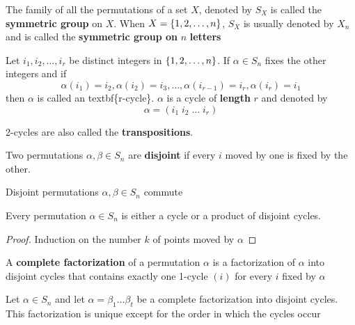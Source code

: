 \documentclass[11pt]{article}
\begin{document}
\begin{definition}[]
The family of all the permutations of a set \(X\), denoted by \(S_X\) is called
the \textbf{symmetric group} on \(X\). When \(X=\left\{ 1,2,\dots,n\right\}\), \(S_X\) is
usually denoted by \(X_n\) and is called the \textbf{symmetric group on } \(n\)
\textbf{letters} 
\end{definition}

\begin{definition}[]
Let \(i_1,i_2,\dots,i_r\) be distinct integers in \(\left\{ 1,2,\dots,n\right\}\). If
\(\alpha\in S_n\) fixes the other integers and if
\begin{equation*}
\alpha(i_1)=i_2,\alpha(i_2)=i_3,\dots,\alpha(i_{r-1})=i_r,\alpha(i_r)=i_1
\end{equation*}
then \(\alpha\) is called an textbf\{r-cycle\}. \(\alpha\) is a cycle of
\textbf{length} \(r\) and denoted by
\begin{equation*}
\alpha=(i_1\; i_2\;\dots\; i_r)
\end{equation*}
\end{definition}

2-cycles are also called the \textbf{transpositions}.

\begin{definition}[]
Two permutations \(\alpha,\beta\in S_n\) are \textbf{disjoint} if every \(i\)
moved by one is fixed by the other.
\end{definition}

\begin{lemma}[]
Disjoint permutations \(\alpha,\beta\in S_n\) commute
\end{lemma}

\begin{proposition}[]
Every permutation \(\alpha\in S_n\) is either a cycle or a product of disjoint cycles.
\end{proposition}

\begin{proof}
Induction on the number \(k\) of points moved by \(\alpha\)
\end{proof}

\begin{definition}[]
A \textbf{complete factorization} of a permutation \(\alpha\) is a
factorization of \(\alpha\) into disjoint cycles that contains exactly one
1-cycle \((i)\) for every \(i\) fixed by \(\alpha\)
\end{definition}

\begin{theorem}[]
Let \(\alpha\in S_n\) and let \(\alpha=\beta_1\dots\beta_t\) be a complete
factorization into disjoint cycles. This factorization is unique except for
the order in which the cycles occur
\end{theorem}
\end{document}
